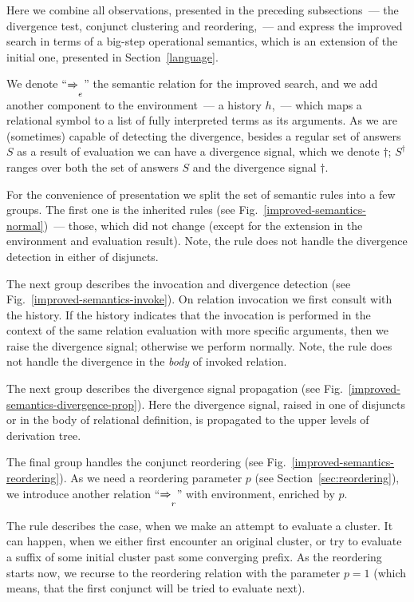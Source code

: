 Here we combine all observations, presented in the preceding subsections~--- the divergence test, conjunct clustering
and reordering,~--- and express the improved search in terms of a big-step operational semantics, which is an extension
of the initial one, presented in Section~\ref{language}.

We denote ``$\xRightarrow{}_e$'' the semantic relation for the improved search, and we add another component to the
environment~--- a history $h$,~--- which maps a relational symbol to a list of fully interpreted terms as its arguments.
As we are (sometimes) capable of detecting the divergence, besides a regular set of answers $S$ as a result of evaluation
we can have a divergence signal, which we denote $\dagger$; $S^\dagger$ ranges over both the set of answers $S$ and the divergence
signal $\dagger$.

For the convenience of presentation we split the set of semantic rules into a few groups. The first one is the inherited
rules (see Fig.~\ref{improved-semantics-normal})~--- those, which did not change (except for the extension in the
environment and evaluation result). Note, the rule  does not handle the divergence detection
in either of disjuncts.

The next group describes the invocation and divergence detection (see Fig.~\ref{improved-semantics-invoke}). On
relation invocation we first consult with the history. If the history indicates that the invocation is performed in the
context of the same relation evaluation with more specific arguments, then we raise the divergence signal; otherwise
we perform normally. Note, the rule  does not handle the divergence in the \emph{body} of
invoked relation.

The next group describes the divergence signal propagation (see Fig.~\ref{improved-semantics-divergence-prop}). Here
the divergence signal, raised in one of disjuncts or in the body of relational definition, is propagated to the upper
levels of derivation tree.

The final group handles the conjunct reordering (see Fig.~\ref{improved-semantics-reordering}). As we need a reordering
parameter $p$ (see Section~\ref{sec:reordering}), we introduce another relation ``$\xRightarrow{}_r$'' with environment,
enriched by $p$.

The rule  describes the case, when we make an attempt to evaluate a cluster. It can happen, when
we either first encounter an original cluster, or try to evaluate a suffix of some initial cluster past some converging
prefix. As the reordering starts now, we recurse to the reordering relation with the parameter \mbox{$p=1$} (which means,
that the first conjunct will be tried to evaluate next).

